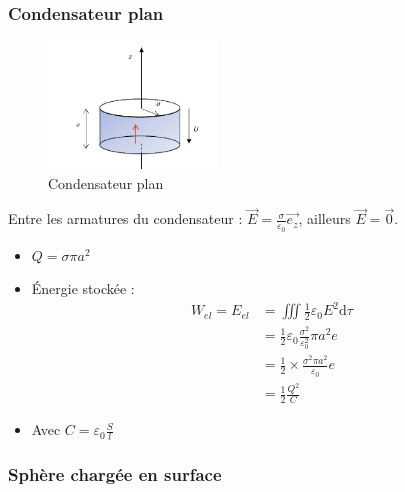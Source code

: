 \subsubsection{Condensateur plan} %
\label{sec:Condensateur plan}

\begin{figure}[H] %
  \centering
  \includegraphics[width=0.4\textwidth]{./assets/Condensateur plan.png}
  \caption{Condensateur plan}
  \label{fig:Condensateur plan}
\end{figure}


Entre les armatures du condensateur : $\overrightarrow{E}= \frac{\sigma}{\varepsilon_0} \overrightarrow{e_z}$, ailleurs $\overrightarrow{E}= \overrightarrow{0}$. 
\begin{itemize}

    \item $Q = \sigma \pi a ^{2}$ 
    \item Énergie stockée : 
      \begin{align}
        W _{el} = E _{el} &= \iiint \frac{1}{2}  \varepsilon_0 E ^{2}\mathrm{d} \tau \\ 
                          &= \frac{1}{2}  \varepsilon_0 \frac{\sigma ^{2}}{\varepsilon_0 ^{2}} \pi a ^{2} e \\
                          &= \frac{1}{2}  \times \frac{\sigma ^{2} \pi a ^{2}}{\varepsilon_0} e \\
                          &= \frac{1}{2}  \frac{Q ^{2}}{C} 
     \end{align}

     \item Avec $C = \varepsilon_0 \frac{S}{l} $

\end{itemize}

\subsubsection{Sphère chargée en surface} %
\label{sec:Sphère chargée en surface}


